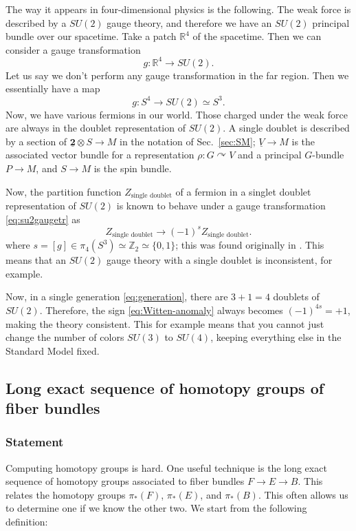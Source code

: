 \documentclass[12pt]{article}
\numberwithin{equation}{section}
\def\bR{\mathbb{R}}
\def\bZ{\mathbb{Z}}
\begin{document}
The way it appears in four-dimensional physics is the following.
The weak force is described by a $SU(2)$ gauge theory,
and therefore we have an $SU(2)$ principal bundle over our spacetime.
Take a patch $\bR^4$ of the spacetime.
Then we can consider a gauge transformation \begin{equation}
  g:\bR^4\to SU(2).
\end{equation}
Let us say we don't perform any gauge transformation in the far region.
Then we essentially have a map \begin{equation}
g: S^4\to SU(2) \simeq S^3. \label{eq:su2gaugetr}
\end{equation}
Now, we have various fermions in our world.
Those charged under the weak force 
are always in the doublet representation of $SU(2)$.
A single doublet is described by a section of $\underline{\mathbf{2}}\otimes S\to M$ 
in the notation of Sec.~\ref{sec:SM};
$\underline{V}\to M$ 
is the associated vector bundle
for a representation $\rho: G \curvearrowright V$
and a principal $G$-bundle $P\to M$,
and $S\to M$ is the spin bundle.

Now, the partition function $Z_\text{single doublet}$ of a fermion in a singlet doublet representation 
of $SU(2)$ 
is known to behave under 
a gauge transformation \eqref{eq:su2gaugetr} as \begin{equation}
  Z_\text{single doublet} \to (-1)^s Z_\text{single doublet}.\label{eq:Witten-anomaly}
\end{equation}
where $s=[g] \in \pi_4(S^3) \simeq \bZ_2 \simeq \{0,1\}$;
this was found originally in \cite{Witten:1982fp}.
This means that an $SU(2)$ gauge theory with a single doublet is inconsistent, for example.

Now, in a single generation \eqref{eq:generation},
there are $3+1=4$ doublets of $SU(2)$.
Therefore, the sign \eqref{eq:Witten-anomaly} always becomes $(-1)^{4s}=+1$,
making the theory consistent.
This for example means that you cannot just change the number of colors $SU(3)$ to $SU(4)$, 
keeping everything else in the Standard Model fixed.


\subsection{Long exact sequence of homotopy groups of fiber bundles}
\subsubsection{Statement}
Computing homotopy groups is hard. 
One useful technique is the long exact sequence of homotopy groups
associated to fiber bundles $F\to E\to B$.
This relates the homotopy groups  $\pi_*(F)$, $\pi_*(E)$, and $\pi_*(B)$.
This often allows us to determine one if we know the other two.
We start from the following definition:
\end{document}
